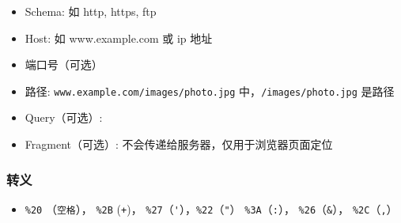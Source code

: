 

\begin{issues}
\issueDraft
\end{issues}

\begin{itemize}
\item Schema: 如 http, https, ftp
\item Host: 如 www.example.com 或 ip 地址
\item 端口号（可选）
\item 路径: \verb`www.example.com/images/photo.jpg` 中，\verb`/images/photo.jpg` 是路径
\item Query（可选）:
\item Fragment（可选）: 不会传递给服务器，仅用于浏览器页面定位
\end{itemize}

\subsubsection{转义}
\begin{itemize}
\item \verb`%20` （\verb`空格`）， \verb`%2B` (\verb`+`)， \verb`%27`（\verb`'`），\verb`%22`（\verb`"`） \verb`%3A`（\verb`:`）， \verb`%26`（\verb`&`）， \verb`%2C`（\verb`,`）
\end{itemize}
